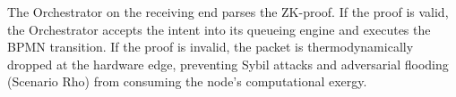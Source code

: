 The Orchestrator on the receiving end parses the ZK-proof. If the proof is valid, the Orchestrator accepts the intent into its queueing engine and executes the BPMN transition. If the proof is invalid, the packet is thermodynamically dropped at the hardware edge, preventing Sybil attacks and adversarial flooding (Scenario Rho) from consuming the node's computational exergy.
